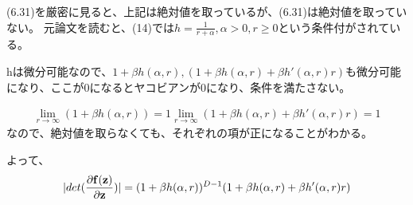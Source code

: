 ﻿\documentclass{jsarticle}
\begin{document}
(6.31)を厳密に見ると、上記は絶対値を取っているが、(6.31)は絶対値を取っていない。
元論文を読むと、(14)では$h = \frac{1}{r + \alpha}, \alpha > 0, r \geq 0$という条件付がされている。

hは微分可能なので、$1 + \beta h(\alpha, r), (1 + \beta h(\alpha, r) + \beta h'(\alpha, r)r)$も微分可能になり、ここが0になるとヤコビアンが0になり、条件を満たさない。

\begin{equation}
\begin{split}
\lim_{r \rightarrow \infty} (1 + \beta h(\alpha, r)) = 1
\lim_{r \rightarrow \infty} (1 + \beta h(\alpha, r) + \beta h'(\alpha, r)r) = 1
\end{split}
\end{equation}
なので、絶対値を取らなくても、それぞれの項が正になることがわかる。

よって、
\begin{equation}
\begin{split}
|det(\frac{\partial {\bf f}({\bf z})}{\partial {\bf z}})|
= (1 + \beta h(\alpha, r))^{D-1} (1 + \beta h(\alpha, r) + \beta h'(\alpha, r)r)
\end{split}
\end{equation}
\end{document}
